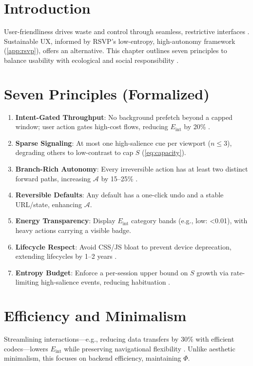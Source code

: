 \documentclass[openany]{book}
\newcommand{\PhiS}{\Phi} %
\newcommand{\Sent}{S} %
\newcommand{\Eint}{E_{\mathrm{int}}} %
\newcommand{\Auton}{\mathcal{A}} %
\newcommand{\kWh}{\mathrm{kWh}}
\begin{document}
\section{Introduction}
\label{sec:principles-intro}
User-friendliness drives waste and control through seamless, restrictive interfaces \citep{doctorow2022}. Sustainable UX, informed by RSVP’s low-entropy, high-autonomy framework (\cref{app:rsvp}), offers an alternative. This chapter outlines seven principles to balance usability with ecological and social responsibility \citep{designlab2024}.

\section{Seven Principles (Formalized)}
\label{sec:seven}
\begin{enumerate}[label=\textbf{P\arabic*}.]
  \item \textbf{Intent-Gated Throughput}: No background prefetch beyond a capped window; user action gates high-cost flows, reducing $\Eint$ by 20\% \citep{extentia2024}.
  \item \textbf{Sparse Signaling}: At most one high-salience cue per viewport ($n \leq 3$), degrading others to low-contrast to cap $\Sent$ (\cref{eq:capacity}).
  \item \textbf{Branch-Rich Autonomy}: Every irreversible action has at least two distinct forward paths, increasing $\Auton$ by 15--25\% \citep{doctorow2022}.
  \item \textbf{Reversible Defaults}: Any default has a one-click undo and a stable URL/state, enhancing $\Auton$.
  \item \textbf{Energy Transparency}: Display $\Eint$ category bands (e.g., low: \SI{<0.01}{\kWh}), with heavy actions carrying a visible badge.
  \item \textbf{Lifecycle Respect}: Avoid CSS/JS bloat to prevent device deprecation, extending lifecycles by 1--2 years \citep{designlab2024}.
  \item \textbf{Entropy Budget}: Enforce a per-session upper bound on $\Sent$ growth via rate-limiting high-salience events, reducing habituation \citep{colak2024}.
\end{enumerate}

\section{Efficiency and Minimalism}
\label{sec:principles-efficiency}
Streamlining interactions---e.g., reducing data transfers by 30\% with efficient codecs---lowers $\Eint$ while preserving navigational flexibility \citep{extentia2024}. Unlike aesthetic minimalism, this focuses on backend efficiency, maintaining $\PhiS$.
\end{document}
